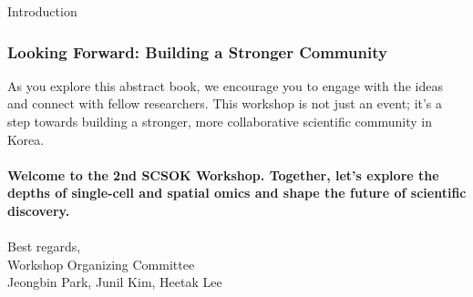 \begin{coverpage}{Introduction}
{\subsubsection*{Looking Forward: Building a Stronger Community}
As you explore this abstract book, we encourage you to engage with the ideas and connect with fellow researchers. This workshop is not just an event; it's a step towards building a stronger, more collaborative scientific community in Korea.
\\
\\
\textbf{Welcome to the 2nd SCSOK Workshop. Together, let's explore the depths of single-cell and spatial omics and shape the future of scientific discovery.}
\\
\vspace{1cm}
\\
\noindent
Best regards, \\ Workshop Organizing Committee \\ Jeongbin Park, Junil Kim, Heetak Lee
}
\end{coverpage}